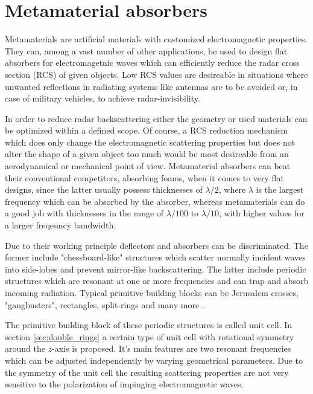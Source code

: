 \section{Metamaterial absorbers}
Metamaterials are artificial materials with customized electromagnetic properties. 
They can, among a vast number of other applications, be used to design flat absorbers for electromagetnic waves which can efficiently reduce the radar cross section (RCS) of given objects. Low RCS values are desireable in situations where unwanted reflections in radiating systems like antennas are to be avoided or, in case of military vehicles, to achieve radar-invisibility.

In order to reduce radar backscattering either the geometry or used materials can be optimized within a defined scope. Of course, a RCS reduction mechanism which does only change the electromagnetic scattering properties but does not alter the shape of a given object too much would be most desireable from an aerodynamical or mechanical point of view. Metamaterial absorbers can beat their conventional competitors, absorbing foams, when it comes to very flat designs, since the latter usually possess thicknesses of $\lambda/2$, where $\lambda$ is the largest frequency which can be absorbed by the absorber, whereas metamaterials can do a good job with thicknesses in the range of $\lambda/100$ to $ \lambda/10$, with higher values for a larger freqeuncy bandwidth.

Due to their working principle deflectors and absorbers can be discriminated. The former include "chessboard-like" structures which scatter normally incident waves into side-lobes and prevent mirror-like backscattering. The latter include periodic structures which are resonant at one or more frequencies and can trap and absorb incoming radiation. Typical primitive building blocks can be Jerusalem crosses, "gangbusters", rectangles, split-rings and many more \cite{Munk2000}.

The primitive building block of these periodic structures is called unit cell. In section \ref{sec:double_rings} a certain type of unit cell with rotational symmetry around the $z$-axis is proposed. It's main features are two resonant frequencies which can be adjusted independently by varying geometrical parameters. Due to the symmetry of the unit cell the resulting scattering properties are not very sensitive to the polarization of impinging electromagnetic waves.